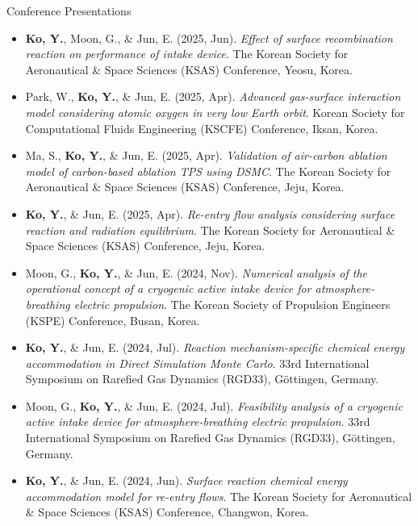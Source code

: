         
        \resumePublicationheading
        {Conference Presentations}{}
        \vspace{2pt}
        \begin{itemize}[leftmargin=0.45in, label={}]
            \item [{[C13]}] \textbf{Ko, Y.}, Moon, G., \& Jun, E. (2025, Jun). \textit{Effect of surface recombination reaction on performance of intake device}. The Korean Society for Aeronautical \& Space Sciences (KSAS) Conference, Yeosu, Korea.
            \item [{[C12]}] Park, W., \textbf{Ko, Y.}, \& Jun, E. (2025, Apr). \textit{Advanced gas-surface interaction model considering atomic oxygen in very low Earth orbit}. Korean Society for Computational Fluids Engineering (KSCFE) Conference, Iksan, Korea.
            \item [{[C11]}] Ma, S., \textbf{Ko, Y.}, \& Jun, E. (2025, Apr). \textit{Validation of air-carbon ablation model of carbon-based ablation TPS using DSMC}. The Korean Society for Aeronautical \& Space Sciences (KSAS) Conference, Jeju, Korea.
            \item [{[C10]}] \textbf{Ko, Y.}, \& Jun, E. (2025, Apr). \textit{Re-entry flow analysis considering surface reaction and radiation equilibrium}. The Korean Society for Aeronautical \& Space Sciences (KSAS) Conference, Jeju, Korea.
            \item [{[C9]}] Moon, G., \textbf{Ko, Y.}, \& Jun, E. (2024, Nov). \textit{Numerical analysis of the operational concept of a cryogenic active intake device for atmosphere-breathing electric propulsion}. The Korean Society of Propulsion Engineers (KSPE) Conference, Busan, Korea.
            \item [{[C8]}] \textbf{Ko, Y.}, \& Jun, E. (2024, Jul). \textit{Reaction mechanism-specific chemical energy accommodation in Direct Simulation Monte Carlo}. 33rd International Symposium on Rarefied Gas Dynamics (RGD33), Göttingen, Germany.
            \item [{[C7]}] Moon, G., \textbf{Ko, Y.}, \& Jun, E. (2024, Jul). \textit{Feasibility analysis of a cryogenic active intake device for atmosphere-breathing electric propulsion}. 33rd International Symposium on Rarefied Gas Dynamics (RGD33), Göttingen, Germany.
            \item [{[C6]}] \textbf{Ko, Y.}, \& Jun, E. (2024, Jun). \textit{Surface reaction chemical energy accommodation model for re-entry flows}. The Korean Society for Aeronautical \& Space Sciences (KSAS) Conference, Changwon, Korea.

\end{itemize}
